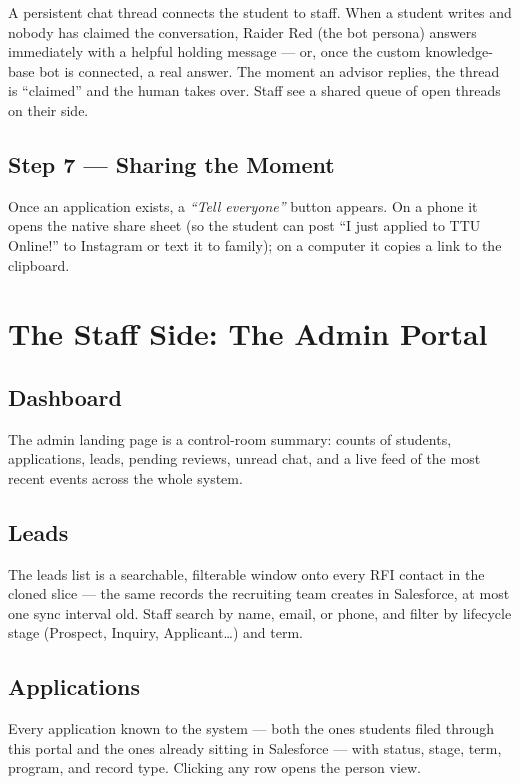 \documentclass[11pt,letterpaper]{report}
\begin{document}
A persistent chat thread connects the student to staff. When a student writes
and nobody has claimed the conversation, Raider Red (the bot persona) answers
immediately with a helpful holding message --- or, once the custom knowledge-base
bot is connected, a real answer. The moment an advisor replies, the thread is
``claimed'' and the human takes over. Staff see a shared queue of open threads
on their side.

\section{Step 7 --- Sharing the Moment}

Once an application exists, a \emph{``Tell everyone''} button appears. On a phone
it opens the native share sheet (so the student can post ``I just applied to TTU
Online!'' to Instagram or text it to family); on a computer it copies a link to
the clipboard.

\chapter{The Staff Side: The Admin Portal}

\section{Dashboard}

The admin landing page is a control-room summary: counts of students,
applications, leads, pending reviews, unread chat, and a live feed of the most
recent events across the whole system.

\section{Leads}

The leads list is a searchable, filterable window onto every RFI contact in the
cloned slice --- the same records the recruiting team creates in Salesforce,
at most one sync interval old. Staff search by name, email, or phone, and
filter by lifecycle stage (Prospect, Inquiry, Applicant\ldots) and term.

\section{Applications}

Every application known to the system --- both the ones students filed through
this portal and the ones already sitting in Salesforce --- with status, stage,
term, program, and record type. Clicking any row opens the person view.
\end{document}

